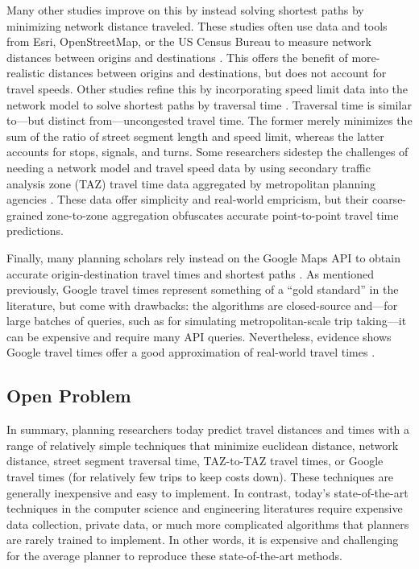 \documentclass[12pt,letterpaper]{article} %
\begin{document}
    Many other studies improve on this by instead solving shortest paths by minimizing network distance traveled. These studies often use data and tools from Esri, OpenStreetMap, or the US Census Bureau to measure network distances between origins and destinations \citep[e.g.,][]{mckenzie2020urban, jiao2021measuring, nicoletti2023disadvantaged, logan2019evaluating, tsou2005accessibility}. This offers the benefit of more-realistic distances between origins and destinations, but does not account for travel speeds. Other studies refine this by incorporating speed limit data into the network model to solve shortest paths by traversal time \citep{kuai2017examining,williams2020parks,he2020evaluating,salonen2013modelling,scott2008role,neutens2010equity,wang2013planning}. Traversal time is similar to---but distinct from---uncongested travel time. The former merely minimizes the sum of the ratio of street segment length and speed limit, whereas the latter accounts for stops, signals, and turns. Some researchers sidestep the challenges of needing a network model and travel speed data by using secondary traffic analysis zone (TAZ) travel time data aggregated by metropolitan planning agencies \citep[e.g.,][]{grengs2010intermetropolitan,yan2021toward,levine2012does}. These data offer simplicity and real-world empricism, but their coarse-grained zone-to-zone aggregation obfuscates accurate point-to-point travel time predictions.

    Finally, many planning scholars rely instead on the Google Maps API to obtain accurate origin-destination travel times and shortest paths \citep[e.g.,][]{fielbaum2021assessment,costa2021spatial, swayne2021integrating,hu2020estimating,cuervo2022dynamic,chen2020communities,hwang2024measuring}. As mentioned previously, Google travel times represent something of a \enquote{gold standard} in the literature, but come with drawbacks: the algorithms are closed-source and---for large batches of queries, such as for simulating metropolitan-scale trip taking---it can be expensive and require many API queries. Nevertheless, evidence shows Google travel times offer a good approximation of real-world travel times \citep{lin2021impact,fu2023comparative,alsobky2020estimating,wang2011estimating}.

    \subsection{Open Problem}

    In summary, planning researchers today predict travel distances and times with a range of relatively simple techniques that minimize euclidean distance, network distance, street segment traversal time, TAZ-to-TAZ travel times, or Google travel times (for relatively few trips to keep costs down). These techniques are generally inexpensive and easy to implement. In contrast, today's state-of-the-art techniques in the computer science and engineering literatures require expensive data collection, private data, or much more complicated algorithms that planners are rarely trained to implement. In other words, it is expensive and challenging for the average planner to reproduce these state-of-the-art methods.
\end{document}
